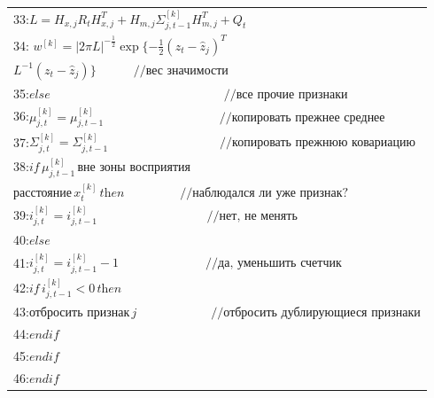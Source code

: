 \documentclass[10pt,a4paper]{article}
\begin{document}
\begin{table}[H]
\begin{center}
\begin{tabular}{|l|}
33:\hspace{15mm}$L=H_{x,j}R_tH_{x,j}^T+H_{m,j}\varSigma_{j,t-1}^{[k]}H_{m,j}^T+Q_t$\\
34:\hspace{15mm}
$w^{[k]}=|2\pi L|^{-\frac{1}{2}}\exp\{-\frac{1}{2}(z_t-\hat{z}_j)^T$\\
\hspace{40mm}$L^{-1}(z_t-\hat{z}_j)\}\quad\qquad//\textit{вес значимости}$\\
35:\hspace{12mm}$\textit{else}\,\,\,\,\,\,\quad\qquad\qquad\qquad\qquad\qquad\qquad//\textit{все прочие признаки}$\\
36:\hspace{15mm}$\mu_{j,t}^{[k]}=\mu_{j,t-1}^{[k]}\,\,\qquad\qquad\quad\qquad\qquad//\textit{копировать прежнее среднее}$\\
37:\hspace{15mm}$\varSigma_{j,t}^{[k]}=\varSigma_{j,t-1}^{[k]}\qquad\qquad\quad\qquad\qquad//\textit{копировать прежнюю ковариацию}$\\
38:\hspace{15mm}$\textit{if}\,\mu_{j,t-1}^{[k]}\,\textit{вне зоны восприятия}$\\
\hspace{30mm}$\textit{расстояние}\,x_t^{[k]}\,\textit{then}\,\,\,\qquad\qquad//\textit{наблюдался ли уже признак?}$\\
39:\hspace{18mm}$i_{j,t}^{[k]}=i_{j,t-1}^{[k]}\,\,\,\,\,\qquad\qquad\qquad\qquad//\textit{нет, не менять}$\\
40:\hspace{15mm}$\textit{else}$\\
41:\hspace{18mm}$i_{j,t}^{[k]}=i_{j,t-1}^{[k]}-1\qquad\quad\qquad\qquad//\textit{да, уменьшить счетчик}$\\
42:\hspace{18mm}$\textit{if}\,i_{j,t-1}^{[k]}<0\,\textit{then}$\\
43:\hspace{21mm}$\textit{отбросить признак}\,j\qquad\qquad\qquad//\textit{отбросить дублирующиеся признаки}$\\
44:\hspace{18mm}$\textit{endif}$\\
45:\hspace{15mm}$\textit{endif}$\\
46:\hspace{12mm}$\textit{endif}$\\

\end{tabular}
\end{center}
\end{table}
\end{document}
